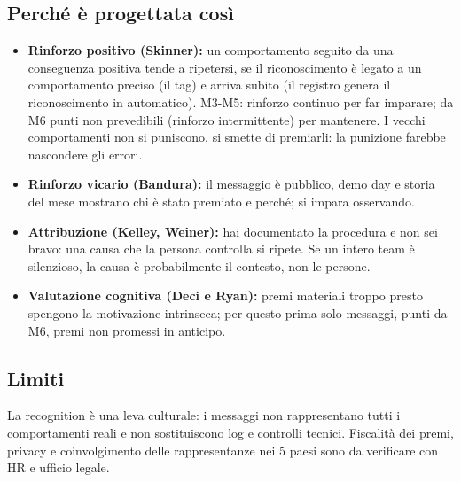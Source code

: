 \documentclass[11pt,a4paper]{article}
\begin{document}
\subsection{Perché è progettata così}\label{sec:13.4}
\begin{itemize}
\item \textbf{Rinforzo positivo (Skinner):} un comportamento seguito da una conseguenza positiva tende a ripetersi, se il riconoscimento è legato a un comportamento preciso (il tag) e arriva subito (il registro genera il riconoscimento in automatico). M3-M5: rinforzo continuo per far imparare; da M6 punti non prevedibili (rinforzo intermittente) per mantenere. I vecchi comportamenti non si puniscono, si smette di premiarli: la punizione farebbe nascondere gli errori.
\item \textbf{Rinforzo vicario (Bandura):} il messaggio è pubblico, demo day e storia del mese mostrano chi è stato premiato e perché; si impara osservando.
\item \textbf{Attribuzione (Kelley, Weiner):} \guillemotleft{}hai documentato la procedura\guillemotright{} e non \guillemotleft{}sei bravo\guillemotright{}: una causa che la persona controlla si ripete. Se un intero team è silenzioso, la causa è probabilmente il contesto, non le persone.
\item \textbf{Valutazione cognitiva (Deci e Ryan):} premi materiali troppo presto spengono la motivazione intrinseca; per questo prima solo messaggi, punti da M6, premi non promessi in anticipo.
\end{itemize}

\subsection{Limiti}\label{sec:13.5}
La recognition è una leva culturale: i messaggi non rappresentano tutti i comportamenti reali e non sostituiscono log e controlli tecnici. Fiscalità dei premi, privacy e coinvolgimento delle rappresentanze nei 5 paesi sono da verificare con HR e ufficio legale.
\end{document}
